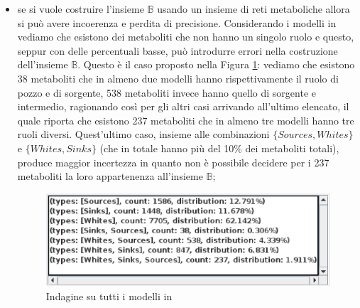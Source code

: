 \begin{itemize}
\item se si vuole costruire l'insieme $\mathbb{B}$ usando un insieme
  di reti metaboliche allora si pu\`o avere incoerenza e perdita di
  precisione. Considerando i modelli in \cite{MetExplore} vediamo che
  esistono dei metaboliti che non hanno un singolo ruolo e questo,
  seppur con delle percentuali basse, pu\`o introdurre errori nella
  costruzione dell'insieme $\mathbb{B}$. Questo \`e il caso proposto
  nella Figura \ref{fig:ResultViewer-MetExplore-models}: vediamo che
  esistono 38 metaboliti che in almeno due modelli hanno
  rispettivamente il ruolo di pozzo e di sorgente, 538 metaboliti
  invece hanno quello di sorgente e intermedio, ragionando cos\`i per
  gli altri casi arrivando all'ultimo elencato, il quale riporta che
  esistono 237 metaboliti che in almeno tre modelli hanno tre ruoli
  diversi. Quest'ultimo caso, insieme alle combinazioni $\{Sources,
  Whites\}$ e $\{Whites, Sinks\}$ (che in totale hanno pi\`u del 10\%
  dei metaboliti totali), produce maggior incertezza in quanto non \`e
  possibile decidere per i 237 metaboliti la loro appartenenza
  all'insieme $\mathbb{B}$;
  \begin{figure}
    \centering
    \includegraphics[scale=.7]{images/ResultViewer-grouping-table-zoom}
    \caption{Indagine su tutti i modelli in \cite{MetExplore}}
    \label{fig:ResultViewer-MetExplore-models}
  \end{figure}


\end{itemize}
